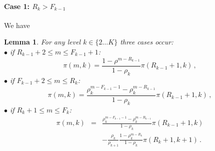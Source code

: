\documentclass[conference]{IEEEtran}
\newtheorem{lem}{Lemma}
\begin{document}
\paragraph{Case 1: $R_{k} > F_{k-1}$}
We have
\begin{lem}
For any level $k \in \{2 \ldots K\}$ three cases occur: \\
$\bullet$ if $R_{k-1}+2 \leq m \leq F_{k-1}+1$:
\begin{equation}
\pi(m,k)=\frac{1-\rho^{m-R_{k-1}} }{1-\rho_k}\pi(R_{k-1}+1,k) \, ,
\label{eq40b}
\end{equation}
$\bullet$ if $F_{k-1}+2 \leq m \leq R_{k}$:
\begin{equation}
\pi(m,k)= \frac{\rho_k^{m-F_{k-1}-1}-\rho_k^{m-R_{k-1}} } {1-\rho_k} \pi(R_{k-1}+1,k) \, ,
\label{eq31}
\end{equation}
$\bullet$ if  $R_k+1 \leq m \leq F_k$:
\begin{eqnarray}
\pi(m,k)&=& \frac{ \rho_k ^{m-F_{k-1}-1 } -\rho_k^{m-R_{k-1}} } {1-\rho_k} \pi(R_{k-1}+1,k) \nonumber \\
 &&- \frac{\rho_k}{\rho_{k+1}} \frac{1- \rho_k ^{m-R_k}} {1-\rho_k} \pi(R_{k}+1, k+1) \, .
 \label{eq38}
\end{eqnarray}
\end{lem}
\end{document}
